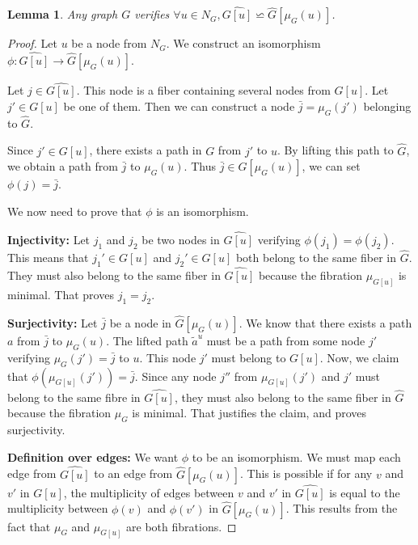 \documentclass[11pt,letterpaper]{article}
\newtheorem{lem}[thm]{Lemma}
\begin{document}
\begin{lem} \label{lem:commuthat} 
	Any graph $G$ verifies $\forall u \in N_G, \widehat{G[u]} \backsimeq \hat G[\mu_G(u)]$.
\end{lem}
\begin{proof}
	Let $u$ be a node from $N_G$.
	We construct an isomorphism $\phi : \widehat{G[u]} \rightarrow \hat G[\mu_G(u)]$.

	Let $j \in \widehat{G[u]}$.
	This node is a fiber containing several nodes from $G[u]$.
	Let $j' \in G[u]$ be one of them.
	Then we can construct a node $\bar j = \mu_G(j')$ belonging to $\hat G$.

	Since $j' \in G[u]$, there exists a path in $G$ from $j'$ to $u$.
	By lifting this path to $\hat G$, we obtain a path from $\bar j$ to $\mu_G(u)$.
	Thus $\bar j \in \hat G[\mu_G(u)]$, we can set $\phi(j) = \bar j$.

	We now need to prove that $\phi$ is an isomorphism.

	\noindent \textbf{Injectivity: } Let $j_1$ and $j_2$ be two nodes in $\widehat{G[u]}$ verifying $\phi(j_1) = \phi(j_2)$.
	This means that $j_1' \in G[u]$ and $j_2' \in G[u]$ both belong to the same fiber in $\hat G$.
	They must also belong to the same fiber in $\widehat{G[u]}$ because the fibration $\mu_{G[u]}$ is minimal.
	That proves $j_1 = j_2$.

	\noindent \textbf{Surjectivity: } Let $\bar j$ be a node in $\hat G[\mu_G(u)]$.
	We know that there exists a path $a$ from $\bar j$ to $\mu_G(u)$.
	The lifted path $\tilde{a}^u$ must be a path from some node $j'$ verifying $\mu_G(j') = \bar j$ to $u$.
	This node $j'$ must belong to $G[u]$.
	Now, we claim that $\phi(\mu_{G[u]}(j')) = \bar j$.
	Since any node $j''$ from $\mu_{G[u]}(j')$ and $j'$ must belong to the same fibre in $\widehat{G[u]}$, 
	they must also belong to the same fiber in $\hat G$ because the fibration $\mu_G$ is minimal.
	That justifies the claim, and proves surjectivity.

	\noindent \textbf{Definition over edges:} We want $\phi$ to be an isomorphism. We must map each edge from $\widehat{G[u]}$ to an edge from $\hat G[\mu_G(u)]$.
	This is possible if for any $v$ and $v'$ in $G[u]$, the multiplicity of edges between $v$ and $v'$ in $\widehat{G[u]}$
	is equal to the multiplicity between $\phi(v)$ and $\phi(v')$ in $\hat G[\mu_G(u)]$.
	This results from the fact that $\mu_G$ and $\mu_{G[u]}$ are both fibrations.

\end{proof}
\end{document}
